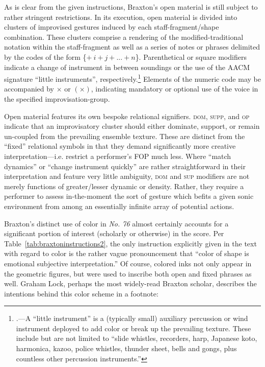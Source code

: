         As is clear from the given instructions, Braxton's open material is still subject to rather stringent restrictions. In its execution, open material is divided into clusters of improvised gestures induced by each staff-fragment/shape combination. These clusters comprise a rendering of the modified-traditional notation within the staff-fragment as well as a series of notes or phrases delimited by the codes of the form \{$+\:i + j +... + n$\}. Parenthetical or square modifiers indicate a change of instrument in between soundings or the use of the AACM signature ``little instruments'', respectively.\footnote{\autocite[170]{Jost_1994}.---A ``little instrument'' is a (typically small) auxiliary percussion or wind instrument deployed to add color or break up the prevailing texture. These include but are not limited to ``slide whistles, recorders, harp, Japanese koto, harmonica, kazoo, police whistles, thunder sheet, bells and gongs, plus countless other percussion instruments.''} Elements of the numeric code may be accompanied by $\times$ or $(\times)$, indicating mandatory or optional use of the voice in the specified improvisation-group.
    
        Open material features its own bespoke relational signifiers. \textsc{dom}, \textsc{supp}, and \textsc{op} indicate that an improvisatory cluster should either dominate, support, or remain un-coupled from the prevailing ensemble texture. These are distinct from the ``fixed'' relational symbols in that they demand significantly more creative interpretation---i.e. restrict a performer's FOP much less. Where ``match dynamics'' or ``change instrument quickly'' are rather straightforward in their interpretation and feature very little ambiguity, \textsc{dom} and \textsc{sup} modifiers are not merely functions of greater/lesser dynamic or density. Rather, they require a performer to assess in-the-moment the sort of gesture which befits a given sonic environment from among an essentially infinite array of potential actions.


        Braxton's distinct use of color in \textit{No. 76} almost certainly accounts for a significant portion of interest (scholarly or otherwise) in the score. Per Table~\ref{tab:braxtoninstructions2}, the only instruction explicitly given in the text with regard to color is the rather vague pronouncement that ``color of shape is emotional subjective interpretation.'' Of course, colored inks not only appear in the geometric figures, but were used to inscribe both open and fixed phrases as well. Graham Lock, perhaps the most widely-read Braxton scholar, describes the intentions behind this color scheme in a footnote:
        
